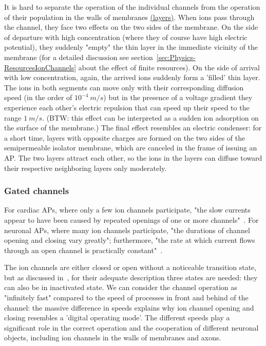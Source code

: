 It is hard to separate the operation of the individual channels
from the operation of their population in the walls of membranes \hyperlink{membrane_layers}{(layers)}.
When ions pass through the channel, they face two effects on the two sides of the membrane.
On the side of departure with high concentration (where they of course have high electric potential), they suddenly "empty"
the thin layer in the immediate vicinity of the membrane (for a detailed discussion see section~\ref{sec:Physics-ResourcesIonChannels} about the effect of finite resources). On the side of arrival with low concentration,
again, the arrived ions suddenly form a 'filled' thin layer.
The ions in both segments can move only with their corresponding diffusion speed
(in the order of $10^{-4}\ m/s$) but in the presence of a voltage gradient they experience each other's electric repulsion
that can speed up their speed to the range $1\ m/s$.
(BTW: this effect can be interpreted
as a sudden ion adsorption \cite{Hodgkin-HuxleyAdsorption:2021}
on the surface of the membrane.) The final effect resembles an electric condenser:
for a short time, layers with opposite charges are formed on the two sides
of the semipermeable isolator membrane, which are canceled
in the frame of issuing an \gls{AP}.
The two layers
attract each other, so the ions in the layers can diffuse toward their respective neighboring layers 
only moderately. 




\subsubsection{Gated channels\label{sec:Physics-GatedChannels}}
For cardiac \gls{AP}s,
where only a few ion channels participate,
"the slow currents appear to
have been caused by repeated openings of one or more channels"~\cite{CardiacAPS:1980}.
For neuronal 
\gls{AP}s,
where many ion channels participate,
"the durations of channel opening and closing vary greatly";
furthermore,
"the rate at which current flows through an open channel is practically constant"~\cite{MolecularBiology:2002}.

The ion channels are either closed or open without
a noticeable transition state, but as discussed in~\cite{ThreeStateUnidirectional:2004, MarkovianIonChannel:2005}, for their adequate description three states are needed:
they can also be in inactivated state.
We can consider the channel operation as "infinitely fast" compared
to the speed of processes in front and behind of the channel: the massive difference in speeds
explains why ion channel opening and closing resembles a 'digital
operating mode'.
The different speeds play a significant role in the correct operation and
the cooperation of different neuronal objects, including ion channels
in the walls of membranes and axons.


